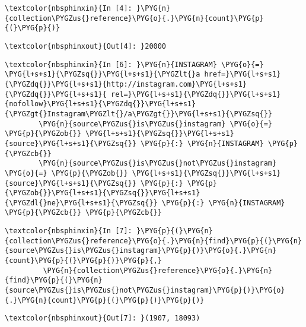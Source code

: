 \documentclass[letterpaper,10pt,english]{sphinxmanual}
\begin{document}
%
\begin{Verbatim}[commandchars=\\\{\}]
\textcolor{nbsphinxin}{In [4]: }\PYG{n}{collection\PYGZus{}reference}\PYG{o}{.}\PYG{n}{count}\PYG{p}{(}\PYG{p}{)}
\end{Verbatim}

%
\begin{Verbatim}[commandchars=\\\{\}]
\textcolor{nbsphinxout}{Out[4]: }20000
\end{Verbatim}

%
\begin{Verbatim}[commandchars=\\\{\}]
\textcolor{nbsphinxin}{In [6]: }\PYG{n}{INSTAGRAM} \PYG{o}{=} \PYG{l+s+s1}{\PYGZsq{}}\PYG{l+s+s1}{\PYGZlt{}a href=}\PYG{l+s+s1}{\PYGZdq{}}\PYG{l+s+s1}{http://instagram.com}\PYG{l+s+s1}{\PYGZdq{}}\PYG{l+s+s1}{ rel=}\PYG{l+s+s1}{\PYGZdq{}}\PYG{l+s+s1}{nofollow}\PYG{l+s+s1}{\PYGZdq{}}\PYG{l+s+s1}{\PYGZgt{}Instagram\PYGZlt{}/a\PYGZgt{}}\PYG{l+s+s1}{\PYGZsq{}}
        \PYG{n}{source\PYGZus{}is\PYGZus{}instagram} \PYG{o}{=} \PYG{p}{\PYGZob{}} \PYG{l+s+s1}{\PYGZsq{}}\PYG{l+s+s1}{source}\PYG{l+s+s1}{\PYGZsq{}} \PYG{p}{:} \PYG{n}{INSTAGRAM} \PYG{p}{\PYGZcb{}}
        \PYG{n}{source\PYGZus{}is\PYGZus{}not\PYGZus{}instagram} \PYG{o}{=} \PYG{p}{\PYGZob{}} \PYG{l+s+s1}{\PYGZsq{}}\PYG{l+s+s1}{source}\PYG{l+s+s1}{\PYGZsq{}} \PYG{p}{:} \PYG{p}{\PYGZob{}}\PYG{l+s+s1}{\PYGZsq{}}\PYG{l+s+s1}{\PYGZdl{}ne}\PYG{l+s+s1}{\PYGZsq{}} \PYG{p}{:} \PYG{n}{INSTAGRAM} \PYG{p}{\PYGZcb{}} \PYG{p}{\PYGZcb{}}
\end{Verbatim}

%
\begin{Verbatim}[commandchars=\\\{\}]
\textcolor{nbsphinxin}{In [7]: }\PYG{p}{(}\PYG{n}{collection\PYGZus{}reference}\PYG{o}{.}\PYG{n}{find}\PYG{p}{(}\PYG{n}{source\PYGZus{}is\PYGZus{}instagram}\PYG{p}{)}\PYG{o}{.}\PYG{n}{count}\PYG{p}{(}\PYG{p}{)}\PYG{p}{,}
         \PYG{n}{collection\PYGZus{}reference}\PYG{o}{.}\PYG{n}{find}\PYG{p}{(}\PYG{n}{source\PYGZus{}is\PYGZus{}not\PYGZus{}instagram}\PYG{p}{)}\PYG{o}{.}\PYG{n}{count}\PYG{p}{(}\PYG{p}{)}\PYG{p}{)}
\end{Verbatim}

%
\begin{Verbatim}[commandchars=\\\{\}]
\textcolor{nbsphinxout}{Out[7]: }(1907, 18093)
\end{Verbatim}
\end{document}
